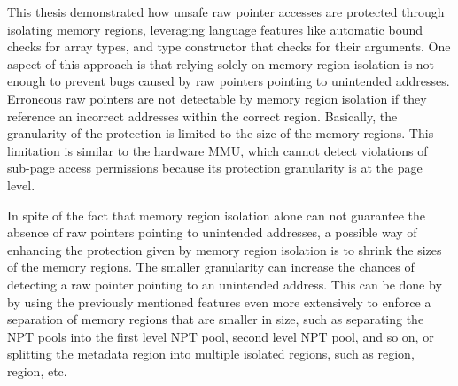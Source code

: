 This thesis demonstrated how unsafe raw pointer accesses are protected through
isolating memory regions,
leveraging language features like automatic bound checks for array types, and
type constructor that checks for their arguments.
One aspect of this approach is that
relying solely on memory region isolation is not enough to prevent bugs caused
by raw pointers pointing to unintended addresses.
Erroneous raw pointers are not detectable by memory region isolation if they
reference an incorrect addresses within the correct region.
Basically, the granularity of the protection is limited to the size of the
memory regions. This limitation is similar to the hardware MMU, which cannot
detect violations of sub-page access permissions because its protection
granularity is at the page level.

In spite of the fact that memory region isolation alone can not guarantee the
absence of raw pointers pointing to unintended addresses,
a possible way of enhancing the protection given by memory region isolation is
to shrink the sizes of the memory regions. The smaller granularity can increase
the chances of detecting a raw pointer pointing to an unintended address.
This can be done by by using the
previously mentioned features even more extensively to enforce a separation of
memory regions that are smaller in size,
such as separating the NPT pools into the first level NPT pool,
second level NPT pool, and so on, or splitting the \rustcore{} metadata region
into multiple isolated regions, such as  region, 
region, etc.

%

